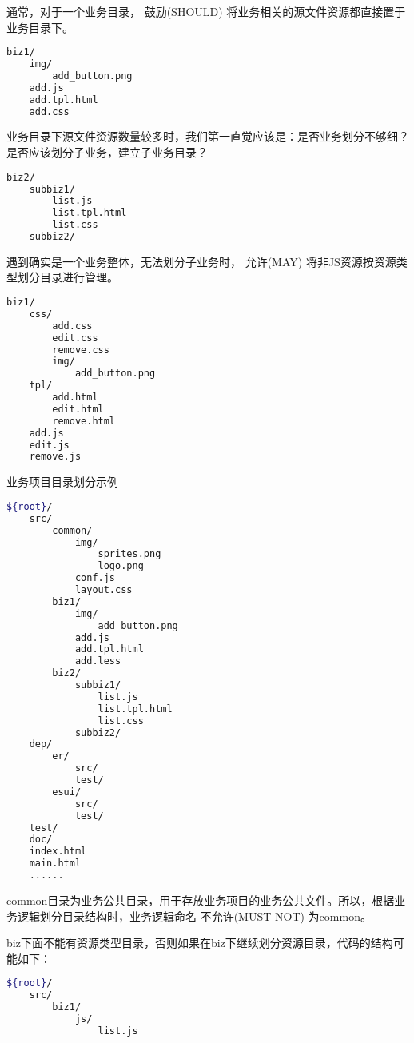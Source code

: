 通常，对于一个业务目录， 鼓励(SHOULD) 将业务相关的源文件资源都直接置于业务目录下。


\begin{lstlisting}[language=bash]
biz1/
    img/
        add_button.png
    add.js
    add.tpl.html
    add.css
\end{lstlisting}

业务目录下源文件资源数量较多时，我们第一直觉应该是：是否业务划分不够细？是否应该划分子业务，建立子业务目录？



\begin{lstlisting}[language=bash]
biz2/
    subbiz1/
        list.js
        list.tpl.html
        list.css
    subbiz2/
\end{lstlisting}

遇到确实是一个业务整体，无法划分子业务时， 允许(MAY) 将非JS资源按资源类型划分目录进行管理。


\begin{lstlisting}[language=bash]
biz1/
    css/
        add.css
        edit.css
        remove.css
        img/
            add_button.png
    tpl/
        add.html
        edit.html
        remove.html
    add.js
    edit.js
    remove.js
\end{lstlisting}

业务项目目录划分示例


\begin{lstlisting}[language=bash]
${root}/
    src/
        common/
            img/
                sprites.png
                logo.png
            conf.js
            layout.css
        biz1/
            img/
                add_button.png
            add.js
            add.tpl.html
            add.less
        biz2/
            subbiz1/
                list.js
                list.tpl.html
                list.css
            subbiz2/
    dep/
        er/
            src/
            test/
        esui/
            src/
            test/
    test/
    doc/
    index.html
    main.html
    ......
\end{lstlisting}


common目录为业务公共目录，用于存放业务项目的业务公共文件。所以，根据业务逻辑划分目录结构时，业务逻辑命名 不允许(MUST NOT) 为common。

biz下面不能有资源类型目录，否则如果在biz下继续划分资源目录，代码的结构可能如下：



\begin{lstlisting}[language=bash]
${root}/
    src/
        biz1/
            js/
                list.js
\end{lstlisting}

